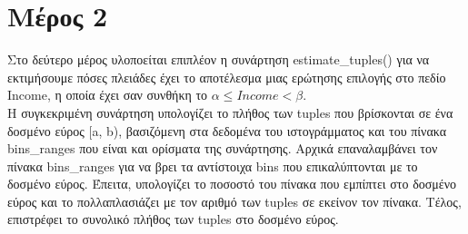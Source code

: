 \documentclass{article}[40pt]
\begin{document}
\section{Μέρος 2}
Στο δεύτερο μέρος υλοποείται επιπλέον η συνάρτηση estimate\_tuples()  για να εκτιμήσουμε πόσες πλειάδες έχει το
αποτέλεσμα μιας ερώτησης επιλογής στο πεδίο Income, η οποία έχει σαν συνθήκη το $α \leq Income < β.$ \\
Η συγκεκριμένη συνάρτηση υπολογίζει το πλήθος των tuples που βρίσκονται σε ένα δοσμένο εύρος [a, b), βασιζόμενη στα δεδομένα του ιστογράμματος και του πίνακα bins\_ranges  που είναι και ορίσματα της συνάρτησης. Αρχικά επαναλαμβάνει τον πίνακα bins\_ranges για να βρει τα αντίστοιχα bins που επικαλύπτονται με το δοσμένο εύρος. Έπειτα, υπολογίζει το ποσοστό του πίνακα που εμπίπτει στο δοσμένο εύρος και το πολλαπλασιάζει με τον αριθμό των tuples σε εκείνον τον πίνακα. Τέλος, επιστρέφει το συνολικό πλήθος των tuples στο δοσμένο εύρος.
\newpage
\end{document}
